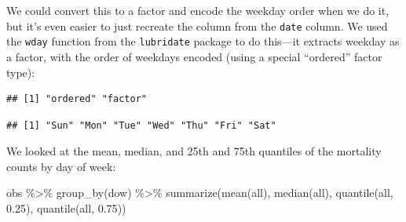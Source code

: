 \documentclass[
]{book}
\newenvironment{Shaded}{\begin{snugshade}}{\end{snugshade}}
\newcommand{\AttributeTok}[1]{\textcolor[rgb]{0.77,0.63,0.00}{#1}}
\newcommand{\ConstantTok}[1]{\textcolor[rgb]{0.00,0.00,0.00}{#1}}
\newcommand{\FloatTok}[1]{\textcolor[rgb]{0.00,0.00,0.81}{#1}}
\newcommand{\FunctionTok}[1]{\textcolor[rgb]{0.00,0.00,0.00}{#1}}
\newcommand{\NormalTok}[1]{#1}
\newcommand{\OtherTok}[1]{\textcolor[rgb]{0.56,0.35,0.01}{#1}}
\newcommand{\SpecialCharTok}[1]{\textcolor[rgb]{0.00,0.00,0.00}{#1}}
\begin{document}
We could convert this to a factor and encode the weekday order when we do
it, but it's even easier to just recreate the column from the \texttt{date} column.
We used the \texttt{wday} function from the \texttt{lubridate} package to do this---it extracts
weekday as a factor, with the order of weekdays encoded (using a special
``ordered'' factor type):

\begin{Shaded}
\end{Shaded}

\begin{verbatim}
## [1] "ordered" "factor"
\end{verbatim}

\begin{Shaded}
\end{Shaded}

\begin{verbatim}
## [1] "Sun" "Mon" "Tue" "Wed" "Thu" "Fri" "Sat"
\end{verbatim}

We looked at the mean, median, and 25th and 75th quantiles of the mortality
counts by day of week:

\begin{Shaded}
\begin{Highlighting}[]
\NormalTok{obs }\SpecialCharTok{\%\textgreater{}\%} 
  \FunctionTok{group\_by}\NormalTok{(dow) }\SpecialCharTok{\%\textgreater{}\%} 
  \FunctionTok{summarize}\NormalTok{(}\FunctionTok{mean}\NormalTok{(all), }
            \FunctionTok{median}\NormalTok{(all), }
            \FunctionTok{quantile}\NormalTok{(all, }\FloatTok{0.25}\NormalTok{), }
            \FunctionTok{quantile}\NormalTok{(all, }\FloatTok{0.75}\NormalTok{))}
\end{Highlighting}
\end{Shaded}
\end{document}
